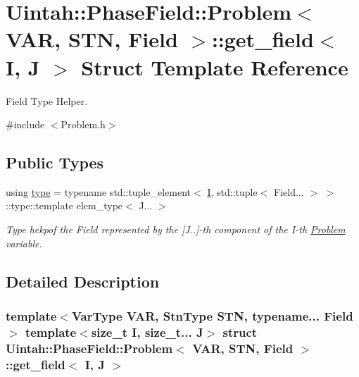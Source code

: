 \hypertarget{structUintah_1_1PhaseField_1_1Problem_1_1get__field}{}\section{Uintah\+:\+:Phase\+Field\+:\+:Problem$<$ V\+AR, S\+TN, Field $>$\+:\+:get\+\_\+field$<$ I, J $>$ Struct Template Reference}
\label{structUintah_1_1PhaseField_1_1Problem_1_1get__field}


Field Type Helper.  




{\ttfamily \#include $<$Problem.\+h$>$}

\subsection*{Public Types}
\begin{DoxyCompactItemize}
\item 
using \hyperlink{structUintah_1_1PhaseField_1_1Problem_1_1get__field_a40f9a8ee2faf5e979fee6bc997991b85}{type} = typename std\+::tuple\+\_\+element$<$ \hyperlink{structUintah_1_1PhaseField_1_1I}{I}, std\+::tuple$<$ Field... $>$ $>$\+::type\+::template elem\+\_\+type$<$ J... $>$
\begin{DoxyCompactList}\small\item\em Type hekpof the Field represented by the \mbox{[}J..\mbox{]}-\/th component of the I-\/th \hyperlink{classUintah_1_1PhaseField_1_1Problem}{Problem} variable. \end{DoxyCompactList}\end{DoxyCompactItemize}


\subsection{Detailed Description}
\subsubsection*{template$<$Var\+Type V\+AR, Stn\+Type S\+TN, typename... Field$>$\newline
template$<$size\+\_\+t I, size\+\_\+t... J$>$\newline
struct Uintah\+::\+Phase\+Field\+::\+Problem$<$ V\+A\+R, S\+T\+N, Field $>$\+::get\+\_\+field$<$ I, J $>$}

